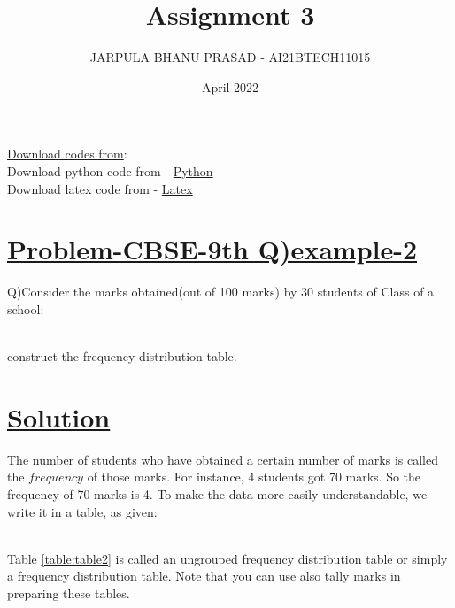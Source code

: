 \documentclass[journal,12pt,twocolumn]{IEEEtran}
\title{Assignment 3}
\author{JARPULA BHANU PRASAD - AI21BTECH11015}
\date{April 2022}
\begin{document}
\maketitle
\noindent \Large\underline{Download codes from}:\\
\noindent\large Download python code from - \href{https://github.com/jarpula-Bhanu/Assignment-3/blob/main/codes/fredat.py}{Python}\\ Download latex code from - \href{}{Latex}

\section{\large\underline{Problem-CBSE-9th Q)example-2}}
\large \noindent Q)Consider the marks obtained(out of 100 marks) by 30 students of Class  of a school: 
\begin{table}[ht!]
\begin{center}
		
		\vspace*{5pt}
		\caption{}
		\label{table:table1}
\end{center}	
	\end{table}\\
construct the frequency distribution table.
\section{\large\underline{Solution}}
\noindent The number of students who have obtained a certain number of marks is called the $frequency$ of those marks. For instance, 4 students got 70 marks. So the frequency of 70 marks is 4. To make the data more easily understandable, we write it in a table, as given:
\begin{table}[ht!]
\begin{center}
		
		\vspace*{5pt}
		\caption{}
		\label{table:table2}	
\end{center}
\end{table}\\

\noindent Table \ref{table:table2} is called an ungrouped frequency distribution table or simply a frequency distribution table. Note that you can use also tally marks in preparing these tables.
\end{document}
